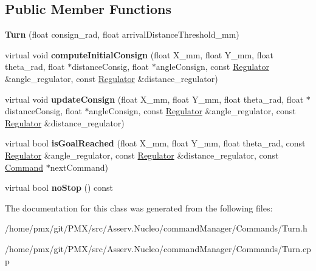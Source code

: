 \subsection*{Public Member Functions}
\begin{DoxyCompactItemize}
\item 
\mbox{\label{classTurn_a2e99e50b09b36ce4f97c0e3996c112f5}} 
{\bfseries Turn} (float consign\+\_\+rad, float arrival\+Distance\+Threshold\+\_\+mm)
\item 
\mbox{\label{classTurn_a10d703ade77d62fa1ac269f8df0b2283}} 
virtual void {\bfseries compute\+Initial\+Consign} (float X\+\_\+mm, float Y\+\_\+mm, float theta\+\_\+rad, float $\ast$distance\+Consig, float $\ast$angle\+Consign, const \hyperlink{classRegulator}{Regulator} \&angle\+\_\+regulator, const \hyperlink{classRegulator}{Regulator} \&distance\+\_\+regulator)
\item 
\mbox{\label{classTurn_a45b48e855baf256b7b28d7220f3740e6}} 
virtual void {\bfseries update\+Consign} (float X\+\_\+mm, float Y\+\_\+mm, float theta\+\_\+rad, float $\ast$distance\+Consig, float $\ast$angle\+Consign, const \hyperlink{classRegulator}{Regulator} \&angle\+\_\+regulator, const \hyperlink{classRegulator}{Regulator} \&distance\+\_\+regulator)
\item 
\mbox{\label{classTurn_af9dcf283563a169a0ab1843e1bbf711f}} 
virtual bool {\bfseries is\+Goal\+Reached} (float X\+\_\+mm, float Y\+\_\+mm, float theta\+\_\+rad, const \hyperlink{classRegulator}{Regulator} \&angle\+\_\+regulator, const \hyperlink{classRegulator}{Regulator} \&distance\+\_\+regulator, const \hyperlink{classCommand}{Command} $\ast$next\+Command)
\item 
\mbox{\label{classTurn_aae514e10f85f17adf824cb1248565b57}} 
virtual bool {\bfseries no\+Stop} () const
\end{DoxyCompactItemize}


The documentation for this class was generated from the following files\+:\begin{DoxyCompactItemize}
\item 
/home/pmx/git/\+P\+M\+X/src/\+Asserv.\+Nucleo/command\+Manager/\+Commands/Turn.\+h\item 
/home/pmx/git/\+P\+M\+X/src/\+Asserv.\+Nucleo/command\+Manager/\+Commands/Turn.\+cpp\end{DoxyCompactItemize}
